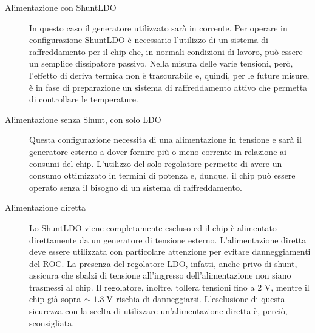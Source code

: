 \begin{description}
\item[Alimentazione con ShuntLDO] In questo caso il generatore utilizzato sarà in corrente. Per operare in configurazione ShuntLDO è necessario l'utilizzo di un sistema di raffreddamento per il chip che, in normali condizioni di lavoro, può essere un semplice dissipatore passivo. Nella misura delle varie tensioni, però, l'effetto di deriva termica non è trascurabile e, quindi, per le future misure, \`e in fase di preparazione un sistema di raffreddamento attivo che permetta di controllare le temperature.

\item[Alimentazione senza Shunt, con solo LDO] Questa configurazione necessita di una alimentazione in tensione e sarà il generatore esterno a dover fornire più o meno corrente in relazione ai consumi del chip. L'utilizzo del solo regolatore permette di avere un consumo ottimizzato in termini di potenza e, dunque, il chip pu\`o essere operato senza il bisogno di un sistema di raffreddamento.

\item[Alimentazione diretta] Lo ShuntLDO viene completamente escluso ed il chip è alimentato direttamente da un generatore di tensione esterno. L'alimentazione diretta deve essere utilizzata con particolare attenzione per evitare danneggiamenti del ROC. La presenza del regolatore LDO, infatti, anche privo di shunt, assicura che sbalzi di tensione all'ingresso dell'alimentazione non siano trasmessi al chip. Il regolatore, inoltre, tollera tensioni fino a 2 V, mentre il chip già sopra $\sim 1.3\rm \; V$ rischia di danneggiarsi. L'esclusione di questa sicurezza con la scelta di utilizzare un'alimentazione diretta è, perciò, sconsigliata. 
\end{description}

